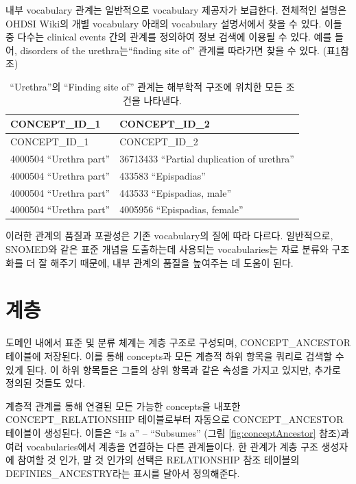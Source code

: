 \documentclass[11pt]{book}
\theoremstyle{definition}
\theoremstyle{definition}
\theoremstyle{definition}
\theoremstyle{remark}
\begin{document}
내부 vocabulary 관계는 일반적으로 vocabulary 제공자가 보급한다. 전체적인
설명은 OHDSI Wiki의 개별 vocabulary 아래의 vocabulary 설명서에서 찾을 수
있다. 이들 중 다수는 clinical events 간의 관계를 정의하여 정보 검색에
이용될 수 있다. 예를 들어, disorders of the urethra는``finding site of''
관계를 따라가면 찾을 수 있다. (표\ref{tab:findingSite}참조)

\begin{longtable}[]{@{}ll@{}}
\caption{\label{tab:findingSite} ``Urethra''의 ``Finding site of'' 관계는
해부학적 구조에 위치한 모든 조건을 나타낸다.}\tabularnewline
\toprule
CONCEPT\_ID\_1 & CONCEPT\_ID\_2\tabularnewline
\midrule
\endfirsthead
\toprule
CONCEPT\_ID\_1 & CONCEPT\_ID\_2\tabularnewline
\midrule
\endhead
4000504 ``Urethra part'' & 36713433 ``Partial duplication of
urethra''\tabularnewline
4000504 ``Urethra part'' & 433583 ``Epispadias''\tabularnewline
4000504 ``Urethra part'' & 443533 ``Epispadias, male''\tabularnewline
4000504 ``Urethra part'' & 4005956 ``Epispadias, female''\tabularnewline
\bottomrule
\end{longtable}

이러한 관계의 품질과 포괄성은 기존 vocabulary의 질에 따라 다르다.
일반적으로, SNOMED와 같은 표준 개념을 도출하는데 사용되는 vocabularies는
자료 분류와 구조화를 더 잘 해주기 때문에, 내부 관계의 품질을 높여주는 데
도움이 된다.

\section{계층}\label{conceptAncestor}

도메인 내에서 표준 및 분류 체계는 계층 구조로 구성되며,
CONCEPT\_ANCESTOR 테이블에 저장된다. 이를 통해 concepts과 모든 계층적
하위 항목을 쿼리로 검색할 수 있게 된다. 이 하위 항목들은 그들의 상위
항목과 같은 속성을 가지고 있지만, 추가로 정의된 것들도 있다.

계층적 관계를 통해 연결된 모든 가능한 concepts을 내포한
CONCEPT\_RELATIONSHIP 테이블로부터 자동으로 CONCEPT\_ANCESTOR 테이블이
생성된다. 이들은 ``Is a'' -- ``Subsumes'' (그림
\ref{fig:conceptAncestor} 참조)과 여러 vocabularies에서 계층을 연결하는
다른 관계들이다. 한 관계가 계층 구조 생성자에 참여할 것 인가, 말 것
인가의 선택은 RELATIONSHIP 참조 테이블의 DEFINIES\_ANCESTRY라는 표시를
달아서 정의해준다.
\end{document}
